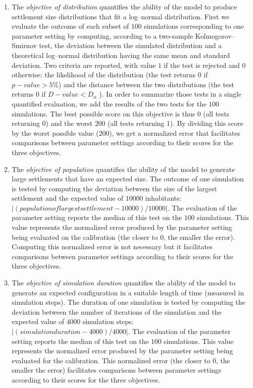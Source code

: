 \begin{enumerate}[label=(\arabic*),labelindent=0pt, leftmargin=*]
\item The \textit{objective of distribution} quantifies the ability of the model to produce settlement size distributions that fit a log–normal distribution. First we evaluate the outcome of each subset of $100$ simulations corresponding to one parameter setting by computing, according to a two-sample Kolmogorov–Smirnov test, the deviation between the simulated distribution and a theoretical log–normal distribution having the same mean and standard deviation. Two criteria are reported, with value $1$ if the test is rejected and $0$ otherwise: the likelihood of the distribution (the test returns $0$ if $p-value > 5\%$) and the distance between the two distributions (the test returns $0$ if $D-value < D_{\alpha}$ ). In order to summarize those tests in a single quantified evaluation, we add the results of the two tests for the $100$ simulations. The best possible score on this objective is thus $0$ (all tests returning $0$) and the worst $200$ (all tests returning 1). By dividing this score by the worst possible value ($200$), we get a normalized error that facilitates comparisons between parameter settings according to their scores for the three objectives.

\item The \textit{objective of population} quantifies the ability of the model to generate large settlements that have an expected size. The outcome of one simulation is tested by computing the deviation between the size of the largest settlement and the expected value of $\num{10000}$ inhabitants: $|(population of largest settlement −\num{10000})/\num{10000}|$. The evaluation of the parameter setting reports the median of this test on the $100$ simulations. This value represents the normalized error produced by the parameter setting being evaluated on the calibration (the closer to $0$, the smaller the error). Computing this normalized error is not necessary but it facilitates comparisons between parameter settings according to their scores for the three objectives.

\item The \textit{objective of simulation duration} quantifies the ability of the model to generate an expected configuration in a suitable length of time (measured in simulation steps). The duration of one simulation is tested by computing the deviation between the number of iterations of the simulation and the expected value of $\num{4000}$ simulation steps: $|(simulation duration − \num{4000})/\num{4000}|$. The evaluation of the parameter setting reports the median of this test on the $100$ simulations. This value represents the normalized error produced by the parameter setting being evaluated for the calibration. This normalized error (the closer to $0$, the smaller the error) facilitates comparisons between parameter settings according to their scores for the three objectives.
\end{enumerate}

